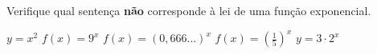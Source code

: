 Verifique qual sentença {\bf não} corresponde à lei de uma função exponencial.

$y=x^2$
$f(x)=9^x$
$f(x)=(0{,}666...)^x$
$f(x)=\left(\frac{1}{5}\right)^x$
$y=3\cdot 2^x$


